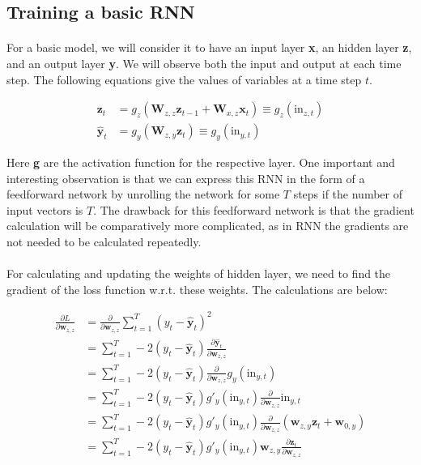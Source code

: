 \documentclass{article}
\begin{document}
  \subsection{Training a basic RNN}
    \paragraph{}For a basic model, we will consider it to have an input layer \textbf{x}, an hidden layer \textbf{z}, and an output layer \textbf{y}. We will observe both the input and output at each time step. The following equations give the values of variables at a time step $t$.
    
    \begin{align*}
      \mathbf{z}_{t} &= g_{z} \left( \mathbf{W}_{z, z} \mathbf{z}_{t-1} + \mathbf{W}_{x, z} \mathbf{x}_{t} \right) \equiv g_{z} (\text{in}_{z,t}) \\
      \hat{\mathbf{y}}_{t} &= g_{y} \left( \mathbf{W}_{z, y} \mathbf{z}_{t} \right) \equiv g_{y} (\text{in}_{y,t})
    \end{align*}

    Here \textbf{g} are the activation function for the respective layer. One important and interesting observation is that we can express this RNN in the form of a feedforward network by unrolling the network for some $T$ steps if the number of input vectors is $T$. The drawback for this feedforward network is that the gradient calculation will be comparatively more complicated, as in RNN the gradients are not needed to be  calculated repeatedly.
    \paragraph{} For calculating and updating the weights of hidden layer, we need to find the gradient of the loss function w.r.t. these weights. The calculations are below:

    \begin{align*}
      \frac{\partial L}{\partial \mathbf{w}_{z,z}} &= \frac{\partial}{\partial \mathbf{w}_{z,z}} \sum_{t=1}^{T} (y_t - \hat{\mathbf{y}}_t)^2 \\
      &= \sum_{t=1}^{T} -2 (y_t - \hat{\mathbf{y}}_t) \frac{\partial \hat{\mathbf{y}}_t}{\partial \mathbf{w}_{z,z}} \\
      &= \sum_{t=1}^{T} -2 (y_t - \hat{\mathbf{y}}_t) \frac{\partial}{\partial \mathbf{w}_{z,z}} g_y(\text{in}_{y,t}) \\
      &= \sum_{t=1}^{T} -2 (y_t - \hat{\mathbf{y}}_t) g'_y(\text{in}_{y,t}) \frac{\partial}{\partial \mathbf{w}_{z,z}} \text{in}_{y,t} \\
      &= \sum_{t=1}^{T} -2 (y_t - \hat{\mathbf{y}}_t) g'_y(\text{in}_{y,t}) \frac{\partial}{\partial \mathbf{w}_{z,z}} \left( \mathbf{w}_{z,y} \mathbf{z}_t + \mathbf{w}_{0,y} \right) \\
      &= \sum_{t=1}^{T} -2 (y_t - \hat{\mathbf{y}}_t) g'_y(\text{in}_{y,t}) \mathbf{w}_{z,y} \frac{\partial \mathbf{z}_t}{\partial \mathbf{w}_{z,z}} 
    \end{align*}
      
\end{document}
